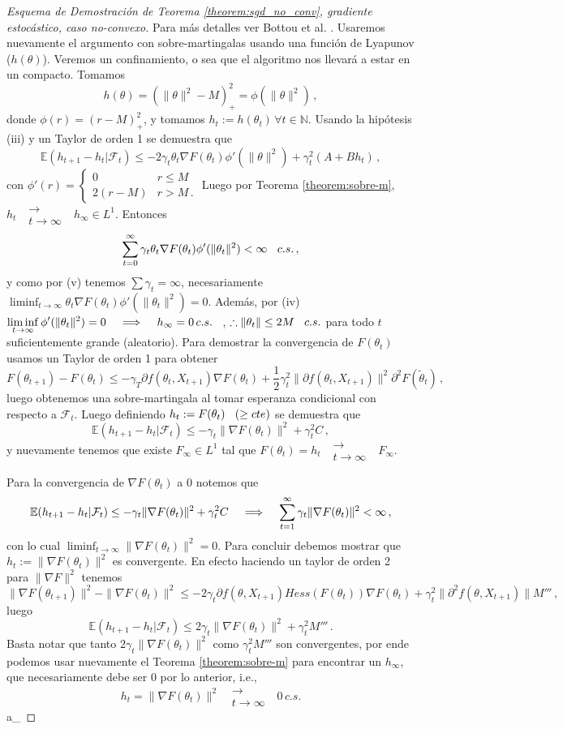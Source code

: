 \documentclass[letterpaper,11pt]{article} %
\def\espacio{\hspace{.25cm}\,}
\theoremstyle{defbreak}
\theoremstyle{propbreak}
\theoremstyle{remark}
\theoremstyle{break}
\def\E{\mathbb{E}}
\def\N{\mathbb{N}}
\def\convt{\mbox{ }\substack{\longrightarrow \\ t\to\infty}\mbox{ }}
\def\gris{\color{mygray}}
\def\negro{\color{black}}
\def\findem{\null\hfill\color{white}a\color{black}_\square}
\begin{document}
\begin{proof}[Esquema de Demostración de Teorema \ref{theorem:sgd_no_conv}, gradiente estocástico, caso no-convexo]
\gris 
Para más detalles ver Bottou et al. \cite{bottou}.
\newp Usaremos nuevamente el argumento con sobre-martingalas usando una función de Lyapunov ($h(\theta)$). Veremos un confinamiento, o sea que el algoritmo nos llevará a estar en un compacto. Tomamos
$$ h(\theta) = (\|\theta\|^2-M)^2_+=\phi(\|\theta\|^2)\,,$$
donde $\phi(r)=(r-M)_+^2$, y tomamos $h_t:=h(\theta_t)\,\forall t\in\N$. Usando la hipótesis (iii) y un Taylor de orden 1 se demuestra que
$$ \E(h_{t+1}-h_t|\mathcal{F}_t) \leq -2\gamma_t\theta_t\nabla F(\theta_t)\phi'(\|\theta\|^2)+\gamma_t^2(A+Bh_t) \,, $$
con $\phi'(r)=\begin{cases}
0 & r\leq M \\ 2(r-M) & r>M \, .
\end{cases}$ 
\newline Luego por Teorema \ref{theorem:sobre-m}, $h_t\convt h_\infty\in L^1$. Entonces
$$ \displaystyle\sum_{t=0}^\infty\gamma_t\theta_t\nabla F(\theta_t)\phi'(\|\theta_t\|^2)<\infty\espacio c.s. \, , $$
y como por (v) tenemos $\sum\gamma_t=\infty$, necesariamente $\displaystyle\liminf_{t\to\infty} \theta_t\nabla F(\theta_t)\phi'(\|\theta_t\|^2) = 0$. Además, por (iv) $\displaystyle\liminf_{t\to\infty}\phi'(\|\theta_t\|^2)=0\espacio \implies \espacio h_\infty=0\,c.s.\espacio$, $\therefore \|\theta_t\|\leq 2M \espacio c.s.$ para todo $t$ suficientemente grande (aleatorio).
\newp Para demostrar la convergencia de $F(\theta_t)$ usamos un Taylor de orden 1 para obtener 
$$ F(\theta_{t+1})-F(\theta_t)\leq -\gamma_T\partial f(\theta_t,X_{t+1})\nabla F(\theta_t)+\frac{1}{2}\gamma^2_t\|\partial f(\theta_t,X_{t+1})\|^2\partial^2F(\tilde{\theta}_t) \,,$$
luego obtenemos una sobre-martingala al tomar esperanza condicional con respecto a $\mathcal{F}_t$. Luego definiendo $h_t:=F(\theta_t)\espacio(\geq cte)$ se demuestra que
$$ \E(h_{t+1}-h_t|\mathcal{F}_t) \leq -\gamma_t\|\nabla F(\theta_t)\|^2+\gamma_t^2C \,,$$
y nuevamente tenemos que existe $F_\infty\in L^1$ tal que $F(\theta_t)=h_t\convt F_\infty$.

\newp Para la convergencia de $\nabla F(\theta_t)$ a $0$ notemos que
$$ \E(h_{t+1}-h_t|\mathcal{F}_t) \leq -\gamma_t\|\nabla F(\theta_t)\|^2+\gamma_t^2C \espacio \implies \espacio \displaystyle\sum^\infty_{t=1}\gamma_t\|\nabla F(\theta_t)\|^2<\infty \,,$$
con lo cual $\displaystyle\liminf_{t\to\infty}\|\nabla F(\theta_t)\|^2=0$. Para concluir debemos mostrar que $h_t:=\|\nabla F(\theta_t)\|^2$ es convergente. En efecto haciendo un taylor de orden 2 para $\|\nabla F\|^2$ tenemos
$$ \|\nabla F(\theta_{t+1})\|^2-\|\nabla F(\theta_t)\|^2 \leq -2\gamma_t\partial f(\theta,X_{t+1})Hess(F(\theta_t))\nabla F(\theta_t)+\gamma_t^2\|\partial^2 f(\theta,X_{t+1})\| M''' \,,$$
luego
$$ \E(h_{t+1}-h_t|\mathcal{F}_t) \leq 2\gamma_t\|\nabla F(\theta_t)\|^2 +\gamma_t^2M''' \,.$$
Basta notar que tanto $2\gamma_t\|\nabla F(\theta_t)\|^2$ como $\gamma_t^2M'''$ son convergentes, por ende podemos usar nuevamente el Teorema \ref{theorem:sobre-m} para encontrar un $h_\infty$, que necesariamente debe ser $0$ por lo anterior, i.e.,
$$ h_t = \|\nabla F(\theta_t)\|^2\convt 0\,c.s.$$
\findem
\negro
\end{proof}
\end{document}
